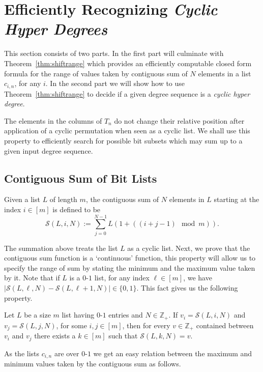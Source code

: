 \section{Efficiently Recognizing {\em Cyclic Hyper Degrees}}
This section consists of two parts. In the first part will culminate with Theorem~\ref{thm:shiftrange} which provides an efficiently computable closed form formula for the range of values taken by contiguous sum of $N$ elements in a list $c_{i,n}$, for any $i$. In the second part we will show how to use Theorem~\ref{thm:shiftrange} to decide if a given degree sequence is a {\em cyclic hyper degree}.

The elements in the columns of $T_n$ do not change their relative position after application of a cyclic permutation when seen as a cyclic list. We shall use this property to efficiently search for possible bit subsets which may sum up to a given input degree sequence.

\subsection{Contiguous Sum of Bit Lists}

\begin{definition}
\label{def:csum}
 Given a list $L$ of length $m$, the contiguous sum of $N$ elements in $L$ starting at the index $i\in [m]$ is defined to be
 $$\mathcal{S}(L,i,N):=\sum_{j=0}^{N-1} L(1+ ((i+j-1)\mod m)).$$
\end{definition}

The summation above treats the list $L$ as a cyclic list. Next, we prove that the contiguous sum function is a `continuous' function, this property will allow us to specify the range of sum by stating the minimum and the maximum value taken by it.
 Note that if $L$ is a $0$-$1$ list, for any index $\ell \in [m]$, 
 we have $\vert \mathcal{S}(L,\ell,N)-\mathcal{S}(L,\ell+1,N) \vert \in \{0,1\}$. This fact gives us the following property.

\begin{observation}
\label{obs:continuity}
 Let $L$ be a size $m$ list having $0$-$1$ entries and $N\in \mathbb{Z}_+$.
 If $v_i=\mathcal{S}(L,i,N)$ and $v_j=\mathcal{S}(L,j,N)$, for some $i,j\in[m]$, then 
 for every $v\in \mathbb{Z}_+$ contained between  $v_i$ and $v_j$
 there exists a $k\in [m]$  such that $\mathcal{S}(L,k,N)=v$.
\end{observation}

As the lists $c_{i,n}$ are over $0$-$1$ we get an easy relation between the maximum and minimum values taken by the contiguous sum as follows.

